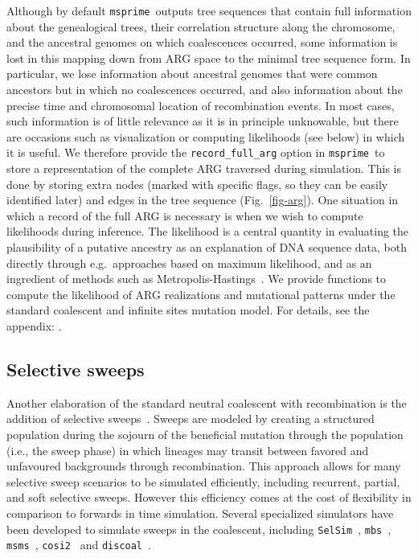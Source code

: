 \documentclass[9pt,twocolumn,twoside,lineno]{gsajnl}
\newcommand{\msprime}[0]{\texttt{msprime}}
\newcommand{\msms}[0]{\texttt{msms}}
\newcommand{\cosiTwo}[0]{\texttt{cosi2}}
\newcommand{\discoal}[0]{\texttt{discoal}}
\begin{document}
Although by default \msprime\ outputs tree sequences that contain full information
about the genealogical trees, their correlation structure along the chromosome,
and the ancestral genomes on which coalescences occurred, some information
is lost in this mapping down from ARG space to the minimal tree sequence
form. In particular, we lose
information about ancestral genomes that were common ancestors but
in which no coalescences occurred, and also information about the precise time
and chromosomal location of recombination events. In most cases, such
information is of little relevance as it is in principle unknowable,
but there are occasions such as visualization or computing likelihoods (see
below) in which it is useful. We therefore provide
the \texttt{record\_full\_arg} option in \msprime\
to store a representation of the complete ARG traversed during simulation.
This is done by storing extra nodes (marked with specific flags, so they
can be easily identified later) and edges in the tree sequence
(Fig.~\ref{fig-arg}).
One situation in which a record of the full ARG is necessary is when we
wish to compute likelihoods during inference.
The likelihood is a central quantity in evaluating the plausibility of a putative
ancestry as an explanation of DNA sequence data, both directly through
e.g.~approaches based on maximum likelihood, and as an ingredient of
methods such as
Metropolis-Hastings~\citep{kuhner2000maximum,nielsen2000estimation,wang2008bayesian}.
We provide functions to compute the likelihood of ARG realizations
and mutational patterns under
the standard coalescent and infinite sites mutation model.
For details, see the appendix: .

\subsection*{Selective sweeps}
\label{sec-selection}
Another elaboration of the standard neutral coalescent with recombination
is the addition of selective
sweeps~\citep{kaplan1989hitchhiking,braverman1995hitchhiking,kim2002detecting}.
Sweeps are modeled by creating a structured population
during the sojourn of the beneficial mutation through the population (i.e., the sweep phase)
in which lineages may transit between favored and unfavoured backgrounds through
recombination. This approach allows for many selective sweep scenarios to be simulated
efficiently, including recurrent, partial, and soft selective sweeps.
However this efficiency comes at the cost of flexibility in comparison to forwards in
time simulation.
Several specialized simulators have been developed to simulate
sweeps in the coalescent,
including \texttt{SelSim}~\citep{spencer2004selsim},
\texttt{mbs}~\citep{teshima2009mbs}, \msms~\citep{ewing2010msms},
\cosiTwo~\citep{shlyakhter2014cosi2}
and \discoal~\citep{kern2016discoal}.
\end{document}
